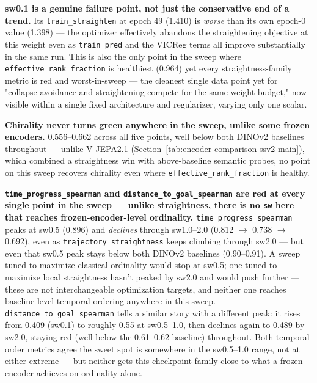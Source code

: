 \textbf{sw0.1 is a genuine failure point, not just the conservative end of a trend.} Its
\texttt{train\_straighten} at epoch 49 (1.410) is \emph{worse} than its own epoch-0 value
(1.398) --- the optimizer effectively abandons the straightening objective at this
weight even as \texttt{train\_pred} and the VICReg terms all improve substantially in the
same run. This is also the only point in the sweep where \texttt{effective\_rank\_fraction}
is healthiest (0.964) yet every straightness-family metric is red and worst-in-sweep ---
the cleanest single data point yet for "collapse-avoidance and straightening compete for
the same weight budget," now visible within a single fixed architecture and regularizer,
varying only one scalar.

\textbf{Chirality never turns green anywhere in the sweep, unlike some frozen encoders.}
0.556--0.662 across all five points, well below both DINOv2 baselines throughout ---
unlike V-JEPA2.1 (Section~\ref{tab:encoder-comparison-ssv2-main}), which combined a
straightness win with above-baseline semantic probes, no point on this sweep recovers
chirality even where \texttt{effective\_rank\_fraction} is healthy.

\textbf{\texttt{time\_progress\_spearman} and \texttt{distance\_to\_goal\_spearman} are
red at every single point in the sweep --- unlike straightness, there is no \texttt{sw}
here that reaches frozen-encoder-level ordinality.} \texttt{time\_progress\_spearman}
peaks at sw0.5 (0.896) and \emph{declines} through sw1.0--2.0 (0.812 $\to$ 0.738 $\to$
0.692), even as \texttt{trajectory\_straightness} keeps climbing through sw2.0 --- but
even that sw0.5 peak stays below both DINOv2 baselines (0.90--0.91). A sweep tuned to
maximize classical ordinality would stop at sw0.5; one tuned to maximize local
straightness hasn't peaked by sw2.0 and would push further --- these are not
interchangeable optimization targets, and neither one reaches baseline-level temporal
ordering anywhere in this sweep. \texttt{distance\_to\_goal\_spearman} tells a similar
story with a different peak: it rises from 0.409 (sw0.1) to roughly 0.55 at sw0.5--1.0,
then declines again to 0.489 by sw2.0, staying red (well below the 0.61--0.62 baseline)
throughout. Both temporal-order metrics agree the sweet spot is somewhere in the
sw0.5--1.0 range, not at either extreme --- but neither gets this checkpoint family
close to what a frozen encoder achieves on ordinality alone.
